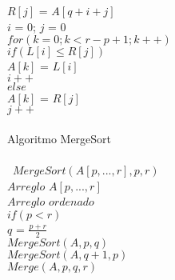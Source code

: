 \documentclass[12pt,twoside]{article}
\begin{document}
\hspace*{2.5cm}$R[j]$ = $A[q+i+j]$\\
\hspace*{2cm}$i$ = 0; $j$ = 0\\
\hspace*{2cm}$for(k=0;k<r-p+1;k++)$\\
\hspace*{2.5cm}$if(L[i]\leq R[j])$\\
\hspace*{3cm}$A[k]$ = $L[i]$\\
\hspace*{3cm}$i++$\\
\hspace*{2.5cm}$else$\\
\hspace*{3cm}$A[k]$ = $R[j]$\\
\hspace*{3cm}$j++$\\\\\newpage
Algoritmo MergeSort\\\\\
\hspace*{1cm}$MergeSort(A[p,...,r],p,r)$\\
\hspace*{1cm}{\bf In:} $Arreglo$ $A[p,...,r]$\\
\hspace*{1cm}{\bf Out:} $Arreglo$ $ordenado$\\
\hspace*{1cm}$if(p<r)$\\
\hspace*{2cm}$q$ = $\frac{p+r}{2}$\\
\hspace*{2cm}$MergeSort(A,p,q)$\\
\hspace*{2cm}$MergeSort(A,q+1,p)$\\
\hspace*{2cm}$Merge(A,p,q,r)$\\
\end{document}
